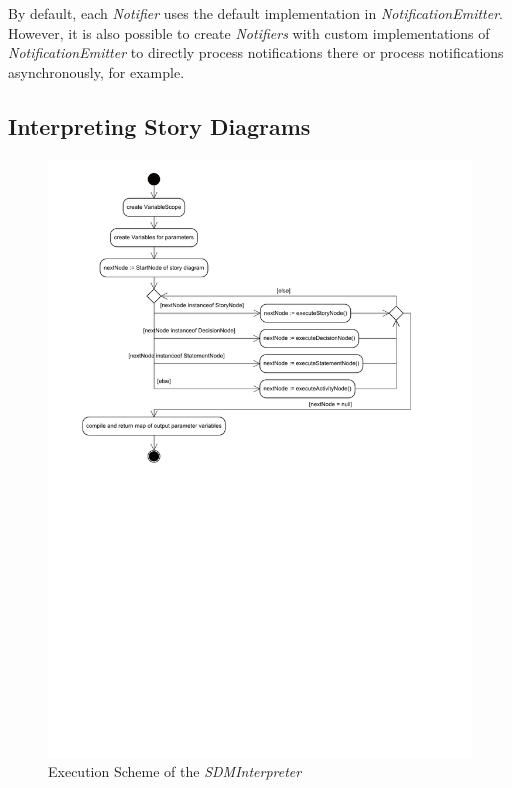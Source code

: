 By default, each \emph{Notifier} uses the default implementation in \emph{NotificationEmitter}. 
However, it is also possible to create \emph{Notifiers} with custom implementations of \emph{NotificationEmitter} to directly process notifications there or process notifications asynchronously, for example.


\subsection{Interpreting Story Diagrams}
\label{sec:sdm_interpreting}

\begin{figure}[htbp]
\center
\includegraphics[scale=0.7]{figures/SDInterpreterExecution.pdf} 
\caption{Execution Scheme of the \emph{SDMInterpreter}}
\label{fig:sdmInterpreter_execution_scheme}
\end{figure}


